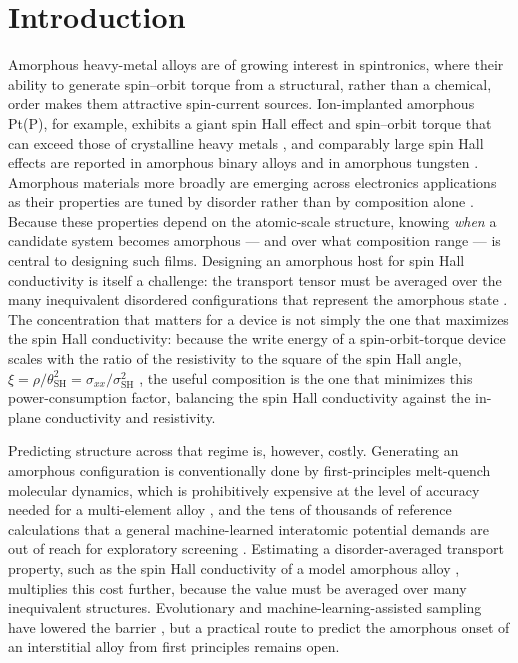 
\section{Introduction}\label{sec:introduction}

Amorphous heavy-metal alloys are of growing interest in spintronics, where
their ability to generate spin--orbit torque from a structural, rather than a
chemical, order makes them attractive spin-current sources. Ion-implanted
amorphous Pt(P), for example, exhibits a giant spin Hall effect and
spin--orbit torque that can exceed those of crystalline heavy metals
\cite{shashank2025}, and comparably large spin Hall effects are reported in
amorphous binary alloys and in amorphous tungsten
\cite{fritz2018,liao2019}. Amorphous materials more broadly are emerging
across electronics applications as their properties are tuned by disorder
rather than by composition alone \cite{shi2025,madanchi2024}. Because these
properties depend on the atomic-scale structure, knowing {\em when} a
candidate system becomes amorphous --- and over what composition range --- is
central to designing such films. Designing an amorphous host for spin Hall
conductivity is itself a challenge: the transport tensor must be averaged
over the many inequivalent disordered configurations that represent the
amorphous state \cite{turek2019,shashank2025}. The concentration that matters
for a device is not simply the one that maximizes the spin Hall conductivity:
because the write energy of a spin-orbit-torque device scales with the ratio
of the resistivity to the square of the spin Hall angle,
$\xi = \rho/\theta_{\mathrm{SH}}^2 = \sigma_{xx}/\sigma_{\mathrm{SH}}^2$
\cite{yoon2025}, the useful composition is the one that minimizes this
power-consumption factor, balancing the spin Hall conductivity against the
in-plane conductivity and resistivity.

Predicting structure across that regime is, however, costly. Generating an
amorphous configuration is conventionally done by first-principles melt-quench
molecular dynamics, which is prohibitively expensive at the level of accuracy
needed for a multi-element alloy \cite{meltquench2026,madanchi2024}, and the
tens of thousands of reference calculations that a general machine-learned
interatomic potential demands are out of reach for exploratory screening
\cite{activemlp2020}. Estimating a disorder-averaged transport property, such
as the spin Hall conductivity of a model amorphous alloy
\cite{turek2019}, multiplies this cost further, because the value must be
averaged over many inequivalent structures. Evolutionary and
machine-learning-assisted sampling have lowered the barrier
\cite{artrith2018,nahas2016,valladares2011}, but a practical route to predict
the amorphous onset of an interstitial alloy from first principles remains
open.

